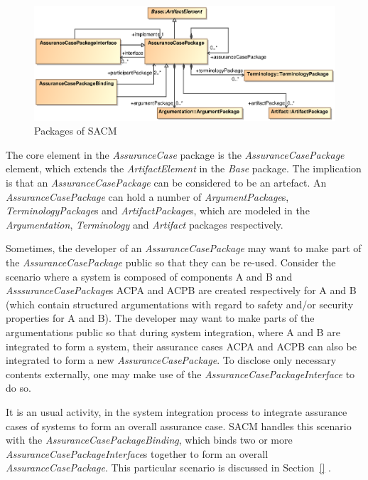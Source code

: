 \begin{figure}
	\centering
	\includegraphics[width=1\linewidth]{fig/AssuranceCase.eps}
	\caption{Packages of SACM}
	\label{fig:ac}
\end{figure}

The core element in the \textit{AssuranceCase} package is the \textit{AssuranceCasePackage} element, which extends the \textit{ArtifactElement} in the \textit{Base} package. The implication is that an \textit{AssuranceCasePackage} can be considered to be an artefact. An \textit{AssuranceCasePackage} can hold a number of \textit{ArgumentPackage}s, \textit{TerminologyPackage}s and \textit{ArtifactPackage}s, which are modeled in the \textit{Argumentation}, \textit{Terminology} and \textit{Artifact} packages respectively.

Sometimes, the developer of an \textit{AssuranceCasePackage} may want to make part of the \textit{AssuranceCasePackage} public so that they can be re-used. Consider the scenario where a system is composed of components A and B and \textit{AsssuranceCasePackage}s ACPA and ACPB are created respectively for A and B (which contain structured argumentations with regard to safety and/or security properties for A and B). The developer may want to make parts of the argumentations public so that during system integration, where A and B are integrated to form a system, their assurance cases ACPA and ACPB can also be integrated to form a new \textit{AssuranceCasePackage}. To disclose only necessary contents externally, one may make use of the \textit{AssuranceCasePackageInterface} to do so. 

It is an usual activity, in the system integration process to integrate assurance cases of systems to form an overall assurance case. SACM handles this scenario with the \textit{AssuranceCasePackageBinding}, which binds two or more \textit{AssuranceCasePackageInterface}s together to form an overall \textit{AssuranceCasePackage}. This particular scenario is discussed in Section~\ref{} .

